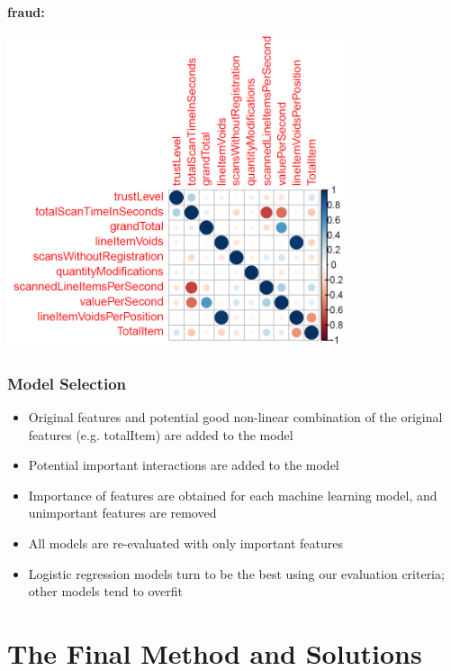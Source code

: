 \documentclass{beamer}
\begin{document}
\begin{frame}
\textbf{fraud:}

\includegraphics[width = 0.75\textwidth]{figure/corr_fraud.PNG}
\end{frame}

\begin{frame}
\frametitle{Model Selection}
\begin{itemize}
    \item Original features and potential good non-linear combination of the original features (e.g. totalItem) are added to the model
    \item Potential important interactions are added to the model
    \item Importance of features are obtained for each machine learning model, and unimportant features are removed
    \item All models are re-evaluated with only important features
    \item Logistic regression models turn to be the best using our evaluation criteria; other models tend to overfit
\end{itemize}
\end{frame}





\section{The Final Method and Solutions}
\end{document}
